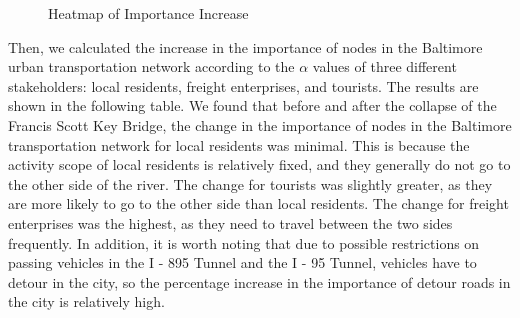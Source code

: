 \documentclass{mcmthesis}
\begin{document}
\begin{figure}[H]
  \centering
  \caption{Heatmap of Importance Increase}
  \label{fig:heatmap}
\end{figure}

Then, we calculated the increase in the importance of nodes in the Baltimore urban transportation network according to the $\alpha$ values of three different stakeholders: local residents, freight enterprises, and tourists. The results are shown in the following table. We found that before and after the collapse of the Francis Scott Key Bridge, the change in the importance of nodes in the Baltimore transportation network for local residents was minimal. This is because the activity scope of local residents is relatively fixed, and they generally do not go to the other side of the river. The change for tourists was slightly greater, as they are more likely to go to the other side than local residents. The change for freight enterprises was the highest, as they need to travel between the two sides frequently. In addition, it is worth noting that due to possible restrictions on passing vehicles in the I - 895 Tunnel and the I - 95 Tunnel, vehicles have to detour in the city, so the percentage increase in the importance of detour roads in the city is relatively high.
\end{document}
